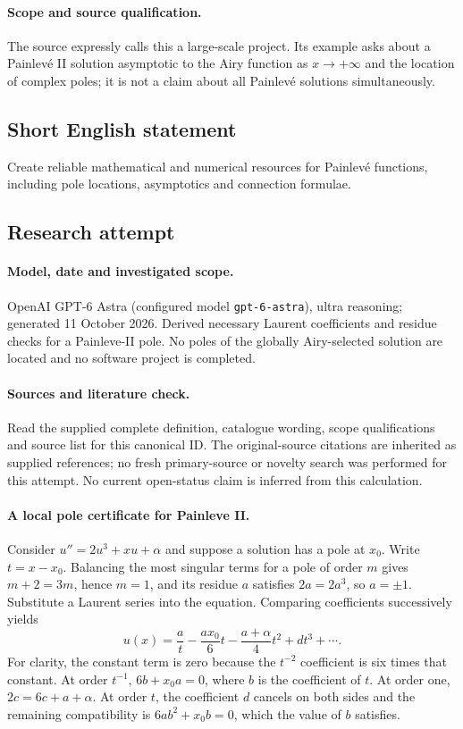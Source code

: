\documentclass[11pt]{article}
\begin{document}
\paragraph{Scope and source qualification.}The source expressly calls this a large-scale project. Its example asks about a Painlevé II solution asymptotic to the Airy function as $x\to+\infty$ and the location of complex poles; it is not a claim about all Painlevé solutions simultaneously.
\subsection{Short English statement}
Create reliable mathematical and numerical resources for Painlevé functions, including pole locations, asymptotics and connection formulae.
\subsection{Research attempt}
\paragraph{Model, date and investigated scope.}
OpenAI GPT-6 Astra (configured model \texttt{gpt-6-astra}), ultra reasoning; generated 11 October 2026. Derived necessary Laurent coefficients and residue checks for a Painleve-II pole. No poles of the globally Airy-selected solution are located and no software project is completed.

\paragraph{Sources and literature check.}
Read the supplied complete definition, catalogue wording, scope qualifications and source list for this canonical ID. The original-source citations are inherited as supplied references; no fresh primary-source or novelty search was performed for this attempt. No current open-status claim is inferred from this calculation.

\paragraph{A local pole certificate for Painleve II.}Consider \(u''=2u^3+xu+\alpha\) and suppose a solution has a pole at \(x_0\). Write \(t=x-x_0\). Balancing the most singular terms for a pole of order \(m\) gives \(m+2=3m\), hence \(m=1\), and its residue \(a\) satisfies \(2a=2a^3\), so \(a=\pm1\). Substitute a Laurent series into the equation. Comparing coefficients successively yields
\[u(x)=\frac a t-\frac{a x_0}{6}t-\frac{a+\alpha}{4}t^2+d t^3+\cdots .\]
For clarity, the constant term is zero because the \(t^{-2}\) coefficient is six times that constant. At order \(t^{-1}\), \(6b+x_0a=0\), where \(b\) is the coefficient of \(t\). At order one, \(2c=6c+a+\alpha\). At order \(t\), the coefficient \(d\) cancels on both sides and the remaining compatibility is \(6ab^2+x_0b=0\), which the value of \(b\) satisfies.
\end{document}
